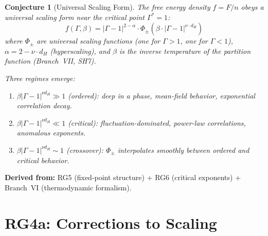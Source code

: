 \documentclass[11pt,letterpaper]{article}
\newtheorem{conjecture}{Conjecture}[section]
\begin{document}
\begin{conjecture}[Universal Scaling 
Form]\label{conj:crossover}
The free energy density $f = F/n$ obeys a universal scaling form 
near the critical point $\Gamma^* = 1$:
\begin{equation}\label{eq:scaling_form}
    f(\Gamma, \beta) = |\Gamma - 1|^{2 - \alpha} \cdot 
    \Phi_\pm\!\left(\beta \cdot |\Gamma - 1|^{\nu \cdot d_H}\right)
\end{equation}
where $\Phi_\pm$ are universal scaling functions (one for 
$\Gamma > 1$, one for $\Gamma < 1$), $\alpha = 2 - \nu \cdot d_H$ 
(hyperscaling), and $\beta$ is the inverse temperature of the 
partition function (Branch~VII, SH7).

Three regimes emerge:
\begin{enumerate}[label=(\alph*)]
    \item $\beta |\Gamma - 1|^{\nu d_H} \gg 1$ (ordered): deep in 
    a phase, mean-field behavior, exponential correlation decay.
    
    \item $\beta |\Gamma - 1|^{\nu d_H} \ll 1$ (critical): 
    fluctuation-dominated, power-law correlations, anomalous 
    exponents.
    
    \item $\beta |\Gamma - 1|^{\nu d_H} \sim 1$ (crossover): 
    $\Phi_\pm$ interpolates smoothly between ordered and critical 
    behavior.
\end{enumerate}
\end{conjecture}

\textbf{Derived from:} RG5 (fixed-point structure) + RG6 (critical 
exponents) + Branch~VI (thermodynamic formalism).

\section{RG4a: Corrections to Scaling}
\end{document}
